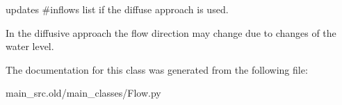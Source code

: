 updates \#inflows list if the diffuse approach is used. 

In the diffusive approach the flow direction may change due to changes of the water level. 

The documentation for this class was generated from the following file\-:\begin{DoxyCompactItemize}
\item 
main\-\_\-src.\-old/main\-\_\-classes/Flow.\-py\end{DoxyCompactItemize}
